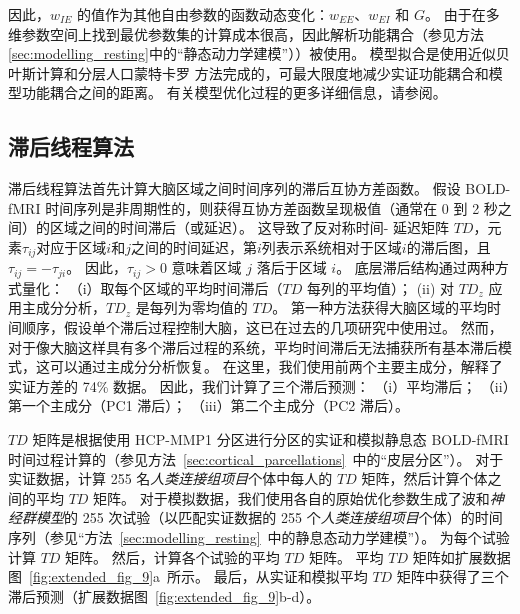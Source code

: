 \documentclass[lang=cn,a4paper,newtx,citestyle=gb7714-2015, bibstyle=gb7714-2015]{elegantpaper}
\begin{document}
因此，$ w_{IE} $ 的值作为其他自由参数的函数动态变化：$ w_{EE} $、$ w_{EI} $ 和 $ G $。
由于在多维参数空间上找到最优参数集的计算成本很高，因此解析功能耦合（参见方法\ref{sec:modelling_resting}中的“静态动力学建模”））被使用。
模型拟合是使用近似贝叶斯计算和分层人口蒙特卡罗 \cite{arnatkeviciute2021genetic,pang2022evolutionary} 方法完成的，可最大限度地减少实证功能耦合和模型功能耦合之间的距离。
有关模型优化过程的更多详细信息，请参阅\cite{rosen2022estimation}。



\subsection{滞后线程算法} \label{sec:lag_threads}

滞后线程算法首先计算大脑区域之间时间序列的滞后互协方差函数。
假设 BOLD-fMRI 时间序列是非周期性的\cite{aquino2020identifying}，则获得互协方差函数呈现极值（通常在 0 到 2 秒之间）的区域之间的时间滞后（或延迟）\cite{gajwani2022can}。
这导致了反对称时间- 延迟矩阵 $ TD $，元素$ \tau_{ij} $对应于区域$ i $和$ j $之间的时间延迟，第$ i $列表示系统相对于区域$ i $的滞后图，且$ \tau_{ij}=- \tau_{ji} $。
因此，$ \tau_{ij}>0 $ 意味着区域 $ j $ 落后于区域 $ i $。
底层滞后结构通过两种方式量化：
（i）取每个区域的平均时间滞后（$ TD $ 每列的平均值）； 
(ii) 对 $ TD_z $ 应用主成分分析，$ TD_z $ 是每列为零均值的 $ TD $。
第一种方法获得大脑区域的平均时间顺序，假设单个滞后过程控制大脑，这已在过去的几项研究中使用过\cite{gajwani2022can,hamid2021wave,yousefi2021propagating}。
然而，对于像大脑这样具有多个滞后过程的系统，平均时间滞后无法捕获所有基本滞后模式，这可以通过主成分分析\cite{coalson2018impact}恢复。
在这里，我们使用前两个主要主成分，解释了实证方差的 74\% 数据。
因此，我们计算了三个滞后预测：
（i）平均滞后； 
（ii）第一个主成分（PC1 滞后）；
（iii）第二个主成分（PC2 滞后）。


$ TD $ 矩阵是根据使用 HCP-MMP1 分区进行分区的实证和模拟静息态 BOLD-fMRI 时间过程计算的（参见方法~\ref{sec:cortical_parcellations}~中的“皮层分区”）。
对于实证数据，计算 255 名\textit{人类连接组项目}个体中每人的 $ TD $ 矩阵，然后计算个体之间的平均 $ TD $ 矩阵。
对于模拟数据，我们使用各自的原始优化参数生成了波和\textit{神经群模型}的 255 次试验（以匹配实证数据的 255 个\textit{人类连接组项目}个体）的时间序列（参见“方法~\ref{sec:modelling_resting}~中的静息态动力学建模”）。
为每个试验计算 $ TD $ 矩阵。
然后，计算各个试验的平均 $ TD $ 矩阵。
平均 $ TD $ 矩阵如扩展数据图~\ref{fig:extended_fig_9}a~所示。
最后，从实证和模拟平均 $ TD $ 矩阵中获得了三个滞后预测（扩展数据图~\ref{fig:extended_fig_9}b-d）。
\end{document}
